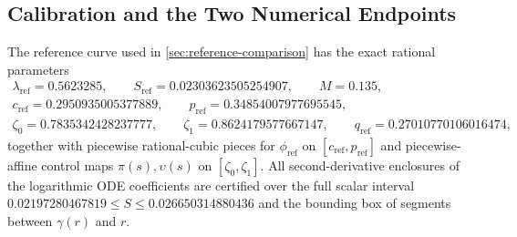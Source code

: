 \documentclass[11pt]{article}
\numberwithin{equation}{section}
\theoremstyle{plain}
\theoremstyle{definition}
\newcommand{\1}{\mathbf{1}}
\begin{document}
\subsection{Calibration and the Two Numerical Endpoints}
\label{app:calibration}

The reference curve used in \cref{sec:reference-comparison} has the exact rational parameters
\[
  \begin{gathered}
    \lambda_{\mathrm{ref}} = 0.5623285, \qquad S_{\mathrm{ref}} = 0.02303623505254907, \qquad M = 0.135, \\
    c_{\mathrm{ref}} = 0.2950935005377889, \qquad p_{\mathrm{ref}} = 0.34854007977695545, \\
    \zeta_0 = 0.7835342428237777, \qquad \zeta_1 = 0.8624179577667147, \qquad q_{\mathrm{ref}} = 0.27010770106016474,
  \end{gathered}
\]
together with piecewise rational-cubic pieces for $\phi_{\mathrm{ref}}$ on $[c_{\mathrm{ref}}, p_{\mathrm{ref}}]$ and piecewise-affine control maps $\pi(s), \upsilon(s)$ on $[\zeta_0, \zeta_1]$. All second-derivative enclosures of the logarithmic ODE coefficients are certified over the full scalar interval $0.02197280467819 \le S \le 0.026650314880436$ and the bounding box of segments between $\gamma(r)$ and $r$.
\end{document}
